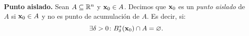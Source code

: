 \begin{definition} \textbf{Punto aislado.} \label{def:pto_ais}
    Sean $A \subseteq \mathbb{R}^n$ y $\vect{x}_0 \in A$. Decimos que $\vect{x}_0$ es un \emph{punto aislado} de $A$ si $\vect{x}_0 \in A$ y no es punto de acumulación de $A$. Es decir, si:
    \[
     \exists \delta > 0 \colon B^*_{\delta}(\vect{x}_0) \cap A = \varnothing. 
    \]
\end{definition}




